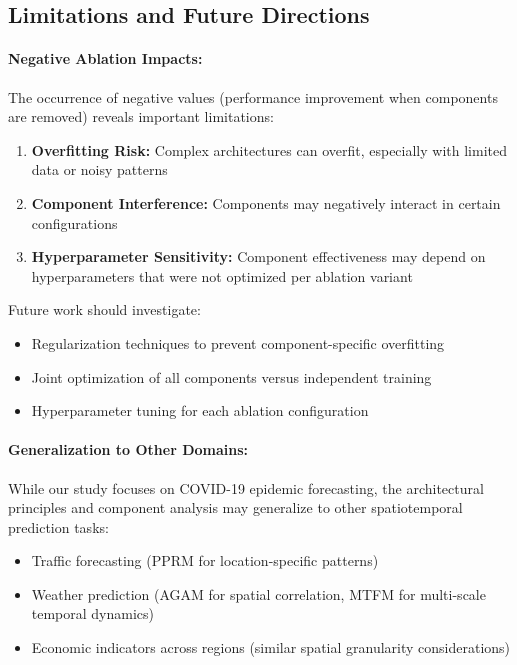 \documentclass[11pt,a4paper]{article}
\begin{document}
\subsection{Limitations and Future Directions}

\paragraph{Negative Ablation Impacts:} The occurrence of negative values (performance improvement when components are removed) reveals important limitations:

\begin{enumerate}
    \item \textbf{Overfitting Risk:} Complex architectures can overfit, especially with limited data or noisy patterns
    \item \textbf{Component Interference:} Components may negatively interact in certain configurations
    \item \textbf{Hyperparameter Sensitivity:} Component effectiveness may depend on hyperparameters that were not optimized per ablation variant
\end{enumerate}

Future work should investigate:
\begin{itemize}
    \item Regularization techniques to prevent component-specific overfitting
    \item Joint optimization of all components versus independent training
    \item Hyperparameter tuning for each ablation configuration
\end{itemize}

\paragraph{Generalization to Other Domains:} While our study focuses on COVID-19 epidemic forecasting, the architectural principles and component analysis may generalize to other spatiotemporal prediction tasks:

\begin{itemize}
    \item Traffic forecasting (PPRM for location-specific patterns)
    \item Weather prediction (AGAM for spatial correlation, MTFM for multi-scale temporal dynamics)
    \item Economic indicators across regions (similar spatial granularity considerations)
\end{itemize}
\end{document}

